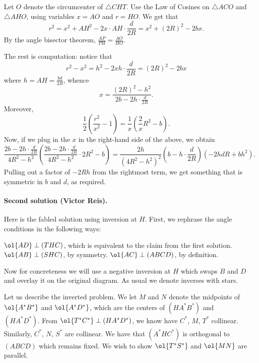 Let $O$ denote the circumcenter of $\triangle CHT$.
Use the Law of Cosines on $\triangle ACO$ and $\triangle AHO$,
using variables $x=AO$ and $r=HO$.
We get that
\[ r^2 = x^2 + AH^2 - 2x \cdot AH \cdot \frac{d}{2R} = x^2 + (2R)^2 - 2bx. \]
By the angle bisector theorem,
$\frac{AP}{PH} = \frac{AO}{HO}$.

The rest is computation: notice that
\[ r^2 - x^2 = h^2 - 2xh \cdot \frac{d}{2R} = (2R)^2 - 2bx \]
where $h = AH = \frac{bd}{2R}$, whence
\[ x = \frac{(2R)^2-h^2}{2b - 2h \cdot \frac{d}{2R}}. \]
Moreover,
\[ \frac{1}{2} \left( \frac{r^2}{x^2}-1 \right)
= \frac{1}{x} \left( \frac 2x R^2 - b \right). \]
Now, if we plug in the $x$ in the
right-hand side of the above, we obtain
\[ \frac{2b-2h \cdot \frac{d}{2R}}{4R^2-h^2}
  \left( \frac{2b-2h \cdot \frac{d}{2R}}{4R^2-h^2} \cdot 2R^2 - b\right)
  = \frac{2h}{(4R^2-h^2)^2} \left( b- h \cdot \frac{d}{2R} \right)
  \left( -2hdR + bh^2 \right). \]
Pulling out a factor of $-2Rh$ from the rightmost term,
we get something that is symmetric in $b$ and $d$, as required.

\paragraph{Second solution (Victor Reis).}
Here is the fabled solution using inversion at $H$.
First, we rephrase the angle conditions in the following ways:
\begin{itemize}
  \ii $\ol{AD} \perp (THC)$,
  which is equivalent to the claim from the first solution.
  \ii $\ol{AB} \perp (SHC)$, by symmetry.
  \ii $\ol{AC} \perp (ABCD)$, by definition.
\end{itemize}
Now for concreteness we will use a negative inversion at $H$
which swaps $B$ and $D$ and overlay it on the original diagram.
As usual we denote inverses with stars.

Let us describe the inverted problem.
We let $M$ and $N$ denote the midpoints of $\ol{A^\ast B^\ast}$
and $\ol{A^\ast D^\ast}$, which are the centers of
$(HA^\ast B^\ast)$ and $(HA^\ast D^\ast)$.
From $\ol{T^\ast C^\ast} \perp (HA^\ast D^\ast)$,
we know have $C^\ast$, $M$, $T^\ast$ collinear.
Similarly, $C^\ast$, $N$, $S^\ast$ are collinear.
We have that $(A^\ast H C^\ast)$ is orthogonal to $(ABCD)$ which remains fixed.
We wish to show $\ol{T^\ast S^\ast}$ and $\ol{MN}$ are parallel.

